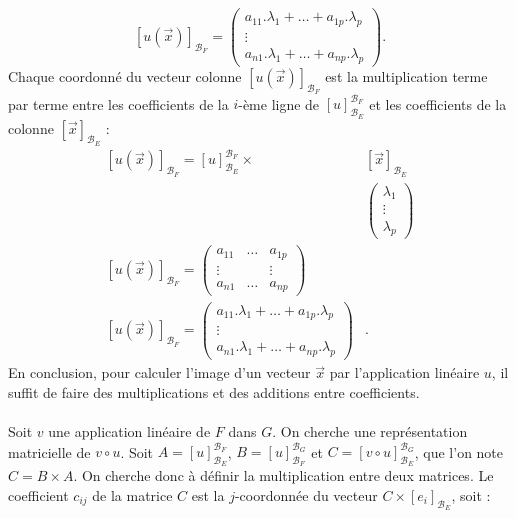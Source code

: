 \documentclass{book}
\begin{document}
$$\left[u(\vec{x})\right]_{\mathcal{B}_F}=\begin{pmatrix}a_{11}.\lambda_1+\dots+a_{1p}.\lambda_p\\ \vdots\\a_{n1}.\lambda_1+\dots+a_{np}.\lambda_p\end{pmatrix}.$$
Chaque coordonné du vecteur colonne $\left[u(\vec{x})\right]_{\mathcal{B}_F}$ est la multiplication terme par terme entre les coefficients de la $i$-ème ligne de $\left[u\right]_{\mathcal{B}_E}^{\mathcal{B}_F}$ et les coefficients de la colonne $\left[\vec{x}\right]_{\mathcal{B}_E}$ : 
$$\begin{aligned}
\left[u(\vec{x})\right]_{\mathcal{B}_F} =  \left[u\right]_{\mathcal{B}_E}^{\mathcal{B}_F} \times&\left[\vec{x}\right]_{\mathcal{B}_E} \\
& \begin{pmatrix}\lambda_1\\\vdots\\\lambda_p\end{pmatrix} \\
\left[u(\vec{x})\right]_{\mathcal{B}_F}=\begin{pmatrix}
    a_{11} &  \dots & a_{1p}  \\
    \vdots &   &  \vdots  \\
    a_{n1} &  \dots & a_{np}
  \end{pmatrix}& \\
 \left[u(\vec{x})\right]_{\mathcal{B}_F}=\begin{pmatrix}a_{11}.\lambda_1+\dots+a_{1p}.\lambda_p\\\vdots\\a_{n1}.\lambda_1+\dots+a_{np}.\lambda_p\end{pmatrix}&.
\end{aligned}$$
En conclusion, pour calculer l'image d'un vecteur $\vec{x}$ par l'application linéaire $u$, il suffit de faire des multiplications et des additions entre coefficients. \\
\\
Soit $v$ une application linéaire de $F$ dans $G$. On cherche une représentation matricielle de $v\circ u$. Soit $A=\left[u\right]_{\mathcal{B}_E}^{\mathcal{B}_F}$, $B=\left[u\right]_{\mathcal{B}_F}^{\mathcal{B}_G}$ et $C=\left[v\circ u\right]_{\mathcal{B}_E}^{\mathcal{B}_G}$, que l'on note $C=B\times A$. On cherche donc à définir la multiplication entre deux matrices. Le coefficient  $c_{ij}$ de la matrice $C$ est la $j$-coordonnée du vecteur $C\times [e_i]_{\mathcal{B}_E}$, soit :  
\end{document}
